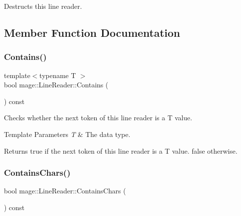 Destructs this line reader. 

\subsection{Member Function Documentation}
\mbox{\label{classmage_1_1_line_reader_a3401db2b0ecd15d8048a1b321eceb77a}} 
\subsubsection{\texorpdfstring{Contains()}{Contains()}}
{\footnotesize\ttfamily template$<$typename T $>$ \\
bool mage\+::\+Line\+Reader\+::\+Contains (\begin{DoxyParamCaption}{ }\end{DoxyParamCaption}) const\hspace{0.3cm}{\ttfamily [protected]}}

Checks whether the next token of this line reader is a {\ttfamily T} value.


\begin{DoxyTemplParams}{Template Parameters}
{\em T} & The data type. \\
\hline
\end{DoxyTemplParams}
\begin{DoxyReturn}{Returns}
{\ttfamily true} if the next token of this line reader is a {\ttfamily T} value. {\ttfamily false} otherwise. 
\end{DoxyReturn}
\mbox{\label{classmage_1_1_line_reader_a0369e06fa3b38ecb22ffd5892759225f}} 
\subsubsection{\texorpdfstring{Contains\+Chars()}{ContainsChars()}}
{\footnotesize\ttfamily bool mage\+::\+Line\+Reader\+::\+Contains\+Chars (\begin{DoxyParamCaption}{ }\end{DoxyParamCaption}) const\hspace{0.3cm}{\ttfamily [protected]}}

